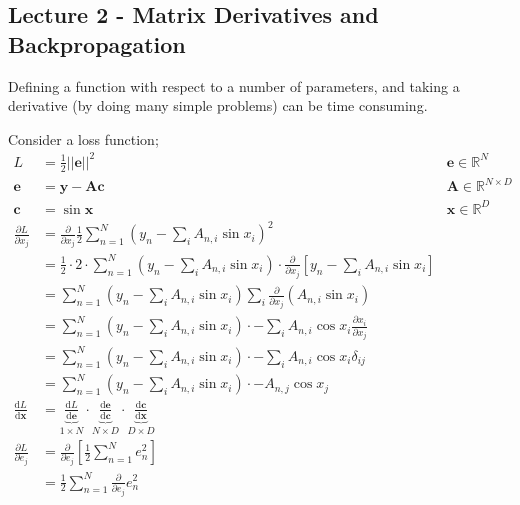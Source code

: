 \documentclass[a4paper, 12pt]{article}
\newcommand{\pdif}[2]{\frac{\partial #1}{\partial #2}}
\newcommand{\dif}[2]{\frac{\mathrm{d}#1}{\mathrm{d}#2}}
\newcommand{\summation}[2]{\sum\limits_{#1}^{#2}}
\newcommand{\mat}[1]{\boldsymbol{#1}}
\renewcommand{\vec}[1]{\boldsymbol{#1}}
\begin{document}
        \subsection*{Lecture 2 - Matrix Derivatives and Backpropagation}
            Defining a function with respect to a number of parameters, and taking a derivative (by doing many simple problems) can be time consuming.

            Consider a loss function;
            \begin{align*}
                L & = \frac{1}{2} || \vec{e} ||^2 & \vec{e} \in \mathbb{R}^N \\
                \vec{e} & = \vec{y} - \mat{A}\vec{c} & \mat{A} \in \mathbb{R}^{N \times D} \\
                \vec{c} & = \sin \vec{x} & \vec{x} \in \mathbb{R}^D \\
                \pdif{L}{x_j} & = \pdif{}{x_j} \frac{1}{2} \summation{n = 1}{N} \left(y_n - \summation{i}{} A_{n, i} \sin x_i\right)^2 \\
                & = \frac{1}{2} \cdot 2 \cdot \summation{n = 1}{N} \left(y_n - \summation{i}{} A_{n, i} \sin x_i\right) \cdot \pdif{}{x_j} \left[y_n - \summation{i}{} A_{n, i} \sin x_i\right] \\
                & = \summation{n = 1}{N} \left(y_n - \summation{i}{} A_{n, i} \sin x_i\right) \summation{i}{} \pdif{}{x_j} (A_{n, i} \sin x_i) \\
                & = \summation{n = 1}{N} \left(y_n - \summation{i}{} A_{n, i} \sin x_i\right) \cdot -\summation{i}{} A_{n, i} \cos x_i \pdif{x_i}{x_j} \\
                & = \summation{n = 1}{N} \left(y_n - \summation{i}{} A_{n, i} \sin x_i\right) \cdot -\summation{i}{} A_{n, i} \cos x_i \delta_{ij} \\
                & = \summation{n = 1}{N} \left(y_n - \summation{i}{} A_{n, i} \sin x_i\right) \cdot - A_{n, j} \cos x_j \\
                \dif{L}{\vec{x}} & = \underbrace{\dif{L}{\vec{e}}}_{1 \times N} \cdot \underbrace{\dif{\vec{e}}{\vec{c}}}_{N \times D} \cdot \underbrace{\dif{\vec{c}}{\vec{x}}}_{D \times D} \\
                \pdif{L}{e_j} & = \pdif{}{e_j} \left[\frac{1}{2} \summation{n = 1}{N} e_n^2 \right] \\
                & = \frac{1}{2} \summation{n = 1}{N} \pdif{}{e_j} e_n^2 \\

\end{align*}
\end{document}
